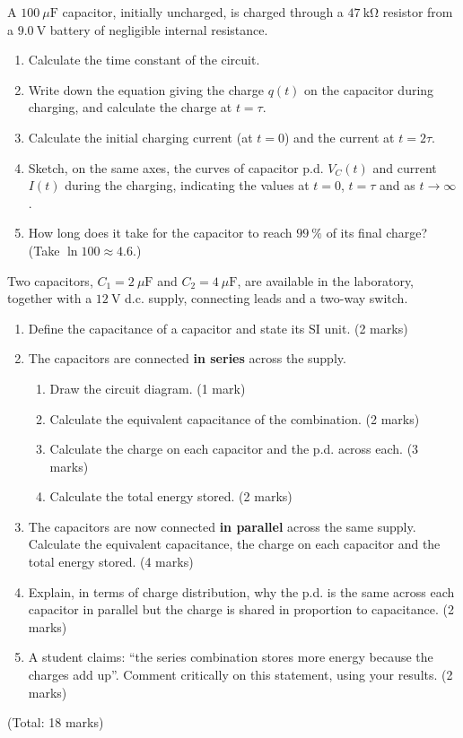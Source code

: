 \documentclass[11pt]{article}
\newcounter{popsec}
\newcounter{popsub}
\newcommand{\courssub}[1]{%
  \stepcounter{popsub}%
  \par\vspace{9pt}\noindent{\popxbold\fontsize{11.5}{13}\selectfont\color{popink}{\color{poporange}\thepopsec.\thepopsub}\hspace{6pt}#1}\par\nopagebreak\vspace{4pt}
}
\begin{document}
\begin{exercice}
A $100\ \mu\mathrm{F}$ capacitor, initially uncharged, is charged through a $47\ \mathrm{k\Omega}$ resistor from a $9.0\ \mathrm{V}$ battery of negligible internal resistance.
\begin{enumerate}
\item Calculate the time constant of the circuit.
\item Write down the equation giving the charge $q(t)$ on the capacitor during charging, and calculate the charge at $t = \tau$.
\item Calculate the initial charging current (at $t = 0$) and the current at $t = 2\tau$.
\item Sketch, on the same axes, the curves of capacitor p.d. $V_C(t)$ and current $I(t)$ during the charging, indicating the values at $t = 0$, $t = \tau$ and as $t \to \infty$.
\item How long does it take for the capacitor to reach $99\ \%$ of its final charge? (Take $\ln 100 \approx 4.6$.)
\end{enumerate}
\end{exercice}

\courssub{I prepare for the GCE}

\begin{exercice}
Two capacitors, $C_1 = 2\ \mu\mathrm{F}$ and $C_2 = 4\ \mu\mathrm{F}$, are available in the laboratory, together with a $12\ \mathrm{V}$ d.c. supply, connecting leads and a two-way switch.
\begin{enumerate}
\item Define the capacitance of a capacitor and state its SI unit. \hfill (2 marks)
\item The capacitors are connected \textbf{in series} across the supply.
\begin{enumerate}
\item Draw the circuit diagram. \hfill (1 mark)
\item Calculate the equivalent capacitance of the combination. \hfill (2 marks)
\item Calculate the charge on each capacitor and the p.d. across each. \hfill (3 marks)
\item Calculate the total energy stored. \hfill (2 marks)
\end{enumerate}
\item The capacitors are now connected \textbf{in parallel} across the same supply. Calculate the equivalent capacitance, the charge on each capacitor and the total energy stored. \hfill (4 marks)
\item Explain, in terms of charge distribution, why the p.d. is the same across each capacitor in parallel but the charge is shared in proportion to capacitance. \hfill (2 marks)
\item A student claims: ``the series combination stores more energy because the charges add up''. Comment critically on this statement, using your results. \hfill (2 marks)
\end{enumerate}
\hfill (Total: 18 marks)
\end{exercice}
\end{document}
